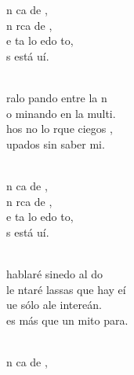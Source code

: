 \documentclass[12pt]{article}
\begin{document}
\begin{multicols*}{2}
\begin{cancion}%
	\begin{chorus}%
	n ca de , \\
	n rca de ,\\
	e ta lo edo to,\\
	s está uí.\\
	\end{chorus}%
	\jump\\
	ralo pando entre la n\\
	o minando en la multi.\\
	hos no lo  rque ciegos ,\\
	upados sin saber mi.\\\jump\\
	\begin{chorus}%
	n ca de , \\
	n rca de ,\\
	e ta lo edo to,\\
	s está uí.\\
	\end{chorus}%
	\jump\\
	 hablaré sinedo al do\\
	le ntaré lassas que hay eí\\
	ue sólo ale intereán.\\
	 es más que un mito para.\\\jump\\
	\begin{chorus}%
	n ca de , \\

\end{chorus}
\end{cancion}
\end{multicols*}
\end{document}
